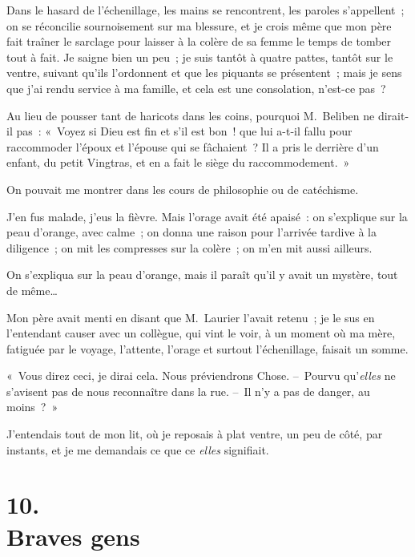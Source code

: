 \documentclass[french,twoside]{book} %
\begin{document}
Dans le hasard de l’échenillage, les mains se rencontrent, les paroles s’appellent ; on se réconcilie sournoisement sur ma blessure, et je crois même que mon père fait traîner le sarclage pour laisser à la colère de sa femme le temps de tomber tout à fait. Je saigne bien un peu ; je suis tantôt à quatre pattes, tantôt sur le ventre, suivant qu’ils l’ordonnent et que les piquants se présentent ; mais je sens que j’ai rendu service à ma famille, et cela est une consolation, n’est-ce pas ?\par
Au lieu de pousser tant de haricots dans les coins, pourquoi M. Beliben ne dirait-il pas : « Voyez si Dieu est fin et s’il est bon ! que lui a-t-il fallu pour raccommoder l’époux et l’épouse qui se fâchaient ? Il a pris le derrière d’un enfant, du petit Vingtras, et en a fait le siège du raccommodement. »\par
On pouvait me montrer dans les cours de philosophie ou de catéchisme.\par
J’en fus malade, j’eus la fièvre. Mais l’orage avait été apaisé : on s’explique sur la peau d’orange, avec calme ; on donna une raison pour l’arrivée tardive à la diligence ; on mit les compresses sur la colère ; on m’en mit aussi ailleurs.\par
On s’expliqua sur la peau d’orange, mais il paraît qu’il y avait un mystère, tout de même…\par
Mon père avait menti en disant que M. Laurier l’avait retenu ; je le sus en l’entendant causer avec un collègue, qui vint le voir, à un moment où ma mère, fatiguée par le voyage, l’attente, l’orage et surtout l’échenillage, faisait un somme.\par
« Vous direz ceci, je dirai cela. Nous préviendrons Chose. – Pourvu qu’\emph{elles} ne s’avisent pas de nous reconnaître dans la rue. – Il n’y a pas de danger, au moins ? »\par
J’entendais tout de mon lit, où je reposais à plat ventre, un peu de côté, par instants, et je me demandais ce que ce \emph{elles} signifiait.
\section[{10. Braves gens}]{10. \\
Braves gens}\renewcommand{\leftmark}{10. \\
Braves gens}
\end{document}
